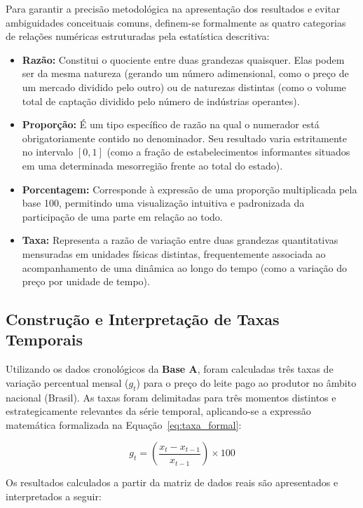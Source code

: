 \documentclass[12pt,a4paper]{article}
\begin{document}
Para garantir a precisão metodológica na apresentação dos resultados e evitar ambiguidades conceituais comuns, definem-se formalmente as quatro categorias de relações numéricas estruturadas pela estatística descritiva:
\begin{itemize}
    \item \textbf{Razão:} Constitui o quociente entre duas grandezas quaisquer. Elas podem ser da mesma natureza (gerando um número adimensional, como o preço de um mercado dividido pelo outro) ou de naturezas distintas (como o volume total de captação dividido pelo número de indústrias operantes).
    \item \textbf{Proporção:} É um tipo específico de razão na qual o numerador está obrigatoriamente contido no denominador. Seu resultado varia estritamente no intervalo $[0, 1]$ (como a fração de estabelecimentos informantes situados em uma determinada mesorregião frente ao total do estado).
    \item \textbf{Porcentagem:} Corresponde à expressão de uma proporção multiplicada pela base 100, permitindo uma visualização intuitiva e padronizada da participação de uma parte em relação ao todo.
    \item \textbf{Taxa:} Representa a razão de variação entre duas grandezas quantitativas mensuradas em unidades físicas distintas, frequentemente associada ao acompanhamento de uma dinâmica ao longo do tempo (como a variação do preço por unidade de tempo).
\end{itemize}

\subsection{Construção e Interpretação de Taxas Temporais}

Utilizando os dados cronológicos da \textbf{Base A}, foram calculadas três taxas de variação percentual mensal ($g_t$) para o preço do leite pago ao produtor no âmbito nacional (Brasil). As taxas foram delimitadas para três momentos distintos e estrategicamente relevantes da série temporal, aplicando-se a expressão matemática formalizada na Equação~\ref{eq:taxa_formal}:

\begin{equation}
\label{eq:taxa_formal}
g_t = \left( \frac{x_t - x_{t-1}}{x_{t-1}} \right) \times 100
\end{equation}

Os resultados calculados a partir da matriz de dados reais são apresentados e interpretados a seguir:
\end{document}
